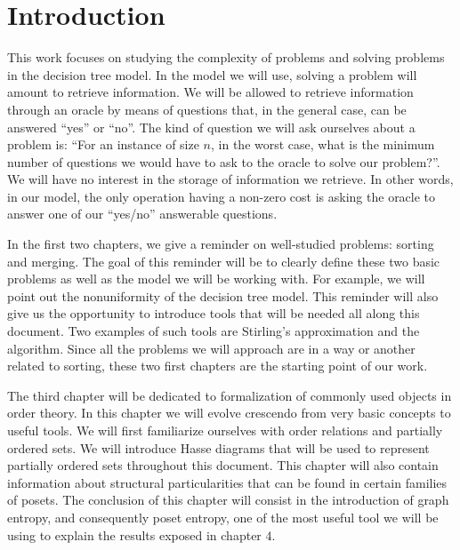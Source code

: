 \chapter*{Introduction}
%

This work focuses on studying the complexity of problems and solving problems
in the decision tree model. In the model we will use, solving a problem will
amount to retrieve information. We will be allowed to retrieve information
through an oracle by means of questions that, in the general case,
can be answered ``yes'' or ``no''. The kind of question we will ask ourselves
about a problem is: ``For an instance of size \(n\), in the worst case, what is
the minimum number of questions we would have to ask to the oracle to solve our
problem?''. We will have no interest in the storage of information we retrieve.
In other words, in our model, the only operation having a non-zero cost is
asking the oracle to answer one of our ``yes/no'' answerable questions.

In the first two chapters, we give a reminder on well-studied problems:
sorting and merging. The goal of this reminder will be to clearly define these
two basic problems as well as the model we will be working with. For example,
we will point out the nonuniformity of the decision tree model. This reminder
will also give us the opportunity to introduce tools that will be needed all along
this document. Two examples of such tools are Stirling's approximation and the
\mergesort algorithm. Since all the problems we will approach are in a way or
another related to sorting, these two first chapters are the starting point of
our work.

The third chapter will be dedicated to formalization of commonly used objects
in order theory. In this chapter we will evolve crescendo from very basic
concepts to useful tools. We will first familiarize ourselves with order
relations and partially ordered sets. We will introduce Hasse diagrams that
will be used to represent partially ordered sets throughout this document.
This chapter will also contain information about structural particularities
that can be found in certain families of posets. The conclusion of this
chapter will consist in the introduction of graph entropy, and consequently
poset entropy, one of the most useful tool we will be using to explain the
results exposed in chapter \(4\).

